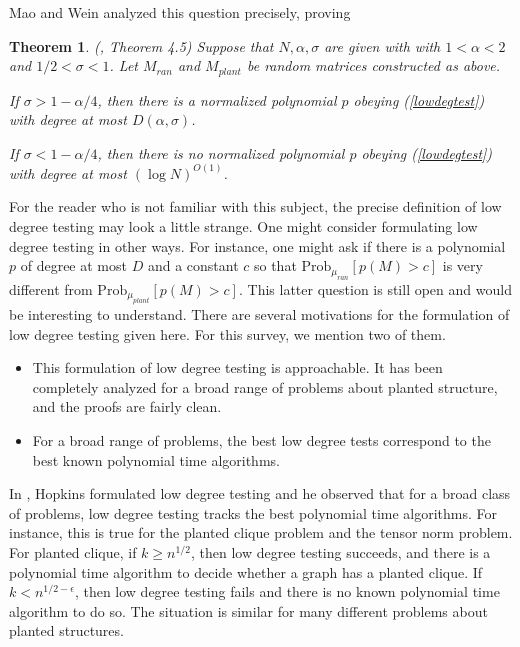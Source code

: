 \documentclass{amsart}
\newtheorem{theorem}[prop]{Theorem}
\newcommand{\Prob}{\textrm{Prob}}
\begin{document}
Mao and Wein analyzed this question precisely, proving

\begin{theorem} (\cite{MW}, Theorem 4.5) Suppose that $N, \alpha, \sigma$ are given with with $1 < \alpha < 2$ and $1/2 < \sigma < 1$.    Let $M_{ran}$ and $M_{plant}$ be random matrices constructed as above.

If $\sigma > 1 - \alpha/4$,  then there is a normalized polynomial $p$ obeying (\ref{lowdegtest}) with degree at most $D(\alpha, \sigma)$.

If $\sigma < 1 - \alpha/4$,  then there is no normalized polynomial $p$ obeying (\ref{lowdegtest}) with degree at most $(\log N)^{O(1)}$.  

\end{theorem}

For the reader who is not familiar with this subject, the precise definition of low degree testing may look a little strange.   One might consider formulating low degree testing in other ways.  For instance,  one might ask if there is a polynomial $p$ of degree at most $D$ and a constant $c$ so that $\Prob_{\mu_{ran}} [ p(M) > c]$ is very different from $\Prob_{\mu_{plant}} [ p(M) > c]$.   This latter question is still open and would be interesting to understand.    There are several motivations for the formulation of low degree testing given here.   For this survey,  we mention two of them.

\begin{itemize}

\item This formulation of low degree testing is approachable.   It has been completely analyzed for a broad range of problems about planted structure,  and the proofs are fairly clean.

\item For a broad range of problems,  the best low degree tests correspond to the best known polynomial time algorithms.  

\end{itemize}


In \cite{Ho},  Hopkins formulated low degree testing and he observed that for a broad class of problems,  low degree testing tracks the best polynomial time algorithms.   For instance,  this is true for the planted clique problem and the tensor norm problem.   For planted clique,  if $k \ge n^{1/2}$, then low degree testing succeeds,  and there is a polynomial time algorithm to decide whether a graph has a planted clique.  If $k < n^{1/2 - \epsilon}$, then low degree testing fails and there is no known polynomial time algorithm to do so.   The situation is similar for many different problems about planted structures. 
\end{document}
